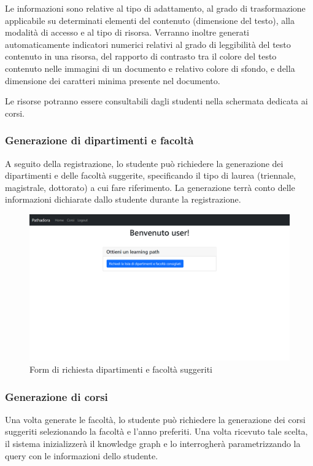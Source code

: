  Le informazioni sono relative al tipo di adattamento, al grado di trasformazione applicabile su determinati elementi del contenuto (dimensione del testo), alla modalità di accesso e al tipo di risorsa. Verranno inoltre generati automaticamente indicatori numerici relativi al grado di leggibilità del testo contenuto in una risorsa, del rapporto di contrasto tra il colore del testo contenuto nelle immagini di un documento e relativo colore di sfondo, e della dimensione dei caratteri minima presente nel documento.

Le risorse potranno essere consultabili dagli studenti nella schermata dedicata ai corsi.

\subsubsection{Generazione di dipartimenti e facoltà}
A seguito della registrazione, lo studente può richiedere la generazione dei dipartimenti e delle facoltà suggerite, specificando il tipo di laurea (triennale, magistrale, dottorato) a cui fare riferimento. La generazione terrà conto delle informazioni dichiarate dallo studente durante la registrazione.

\begin{figure}[H]
\centering
\includegraphics[scale=0.4]{res/faculties-generation.png}
\caption{Form di richiesta dipartimenti e facoltà suggeriti}
\label{fig:faculties-generation}
\end{figure}

\subsubsection{Generazione di corsi}
Una volta generate le facoltà, lo studente può richiedere la generazione dei corsi suggeriti selezionando la facoltà e l'anno preferiti. 
Una volta ricevuto tale scelta, il sistema inizializzerà il knowledge graph e lo interrogherà parametrizzando la query con le informazioni dello studente.

